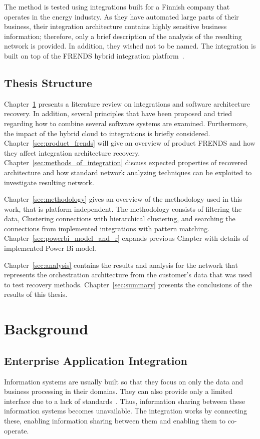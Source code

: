 \documentclass[english, 12pt, a4paper, sci, utf8, a-2b, online, obeyspaces]{aaltothesis}
\begin{document}
The method is tested using integrations built for a Finnish company that operates in the energy industry. As they have automated large parts of their business, their integration architecture contains highly sensitive business information; therefore, only a brief description of the analysis of the resulting network is provided. In addition, they wished not to be named. The integration is built on top of the FRENDS hybrid integration platform~\cite{hiq2018frends}.

\subsection{Thesis Structure}

Chapter~\ref{sec:background} presents a literature review on integrations and software architecture recovery. In addition, several principles that have been proposed and tried regarding how to combine several software systems are examined. Furthermore, the impact of the hybrid cloud to integrations is briefly considered. Chapter~\ref{sec:product_frends} will give an overview of product FRENDS and how they affect integration architecture recovery. Chapter~\ref{sec:methods_of_integration} discuss expected properties of recovered architecture and how standard network analyzing techniques can be exploited to investigate resulting network. 

Chapter~\ref{sec:methodology} gives an overview of the methodology used in this work, that is platform independent. The methodology consists of filtering the data, Clustering connections with hierarchical clustering, and searching the connections from implemented integrations with pattern matching. Chapter~\ref{sec:powerbi_model_and_r} expands previous Chapter with details of implemented Power Bi model.

Chapter~\ref{sec:analysis} contains the results and analysis for the network that represents the orchestration architecture from the customer's data that was used to test recovery methods. Chapter~\ref{sec:summary} presents the conclusions of the results of this thesis.

\clearpage

\section{Background}
\label{sec:background}

\subsection{Enterprise Application Integration}
\label{sec:enterprise_application_integration}
Information systems are usually built so that they focus on only the data and business processing in their domains. They can also provide only a limited interface due to a lack of standards~\cite{song2008research}. Thus, information sharing between these information systems becomes unavailable. The integration works by connecting these, enabling information sharing between them and enabling them to co-operate.
\end{document}
